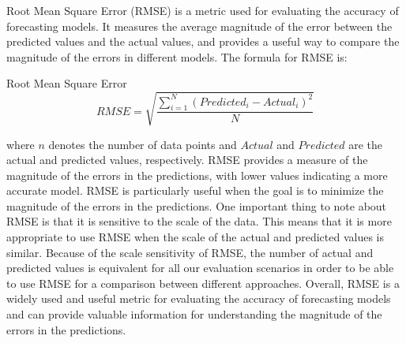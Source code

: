       Root Mean Square Error (RMSE) \cite{chaiRootMeanSquare2014} is a metric used for evaluating the accuracy of forecasting models. It measures the average magnitude of the error between the predicted values and the actual values, and provides a useful way to compare the magnitude of the errors in different models.
      The formula for RMSE is:
      \begin{pabox}{Root Mean Square Error}
        $$RMSE = \sqrt{\frac{\sum_{i = 1}^{N}\left(Predicted_i - Actual_i\right)^2}{N}}$$
      \end{pabox}
      where $n$ denotes the number of data points and $Actual$ and $Predicted$ are the actual and predicted values, respectively.
      RMSE provides a measure of the magnitude of the errors in the predictions, with lower values indicating a more accurate model. 
      RMSE is particularly useful when the goal is to minimize the magnitude of the errors in the predictions.
      One important thing to note about RMSE is that it is sensitive to the scale of the data. This means that it is more appropriate to use RMSE when the scale of the actual and predicted values is similar.
      Because of the scale sensitivity of RMSE, the number of actual and predicted values is equivalent for all our evaluation scenarios in order to be able to use RMSE for a comparison between different approaches.
      Overall, RMSE is a widely used and useful metric for evaluating the accuracy of forecasting models and can provide valuable information for understanding the magnitude of the errors in the predictions.







